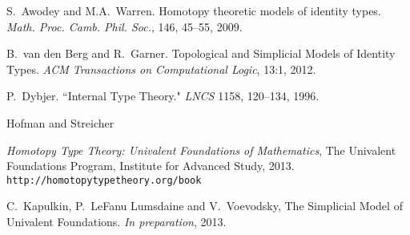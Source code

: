 \documentclass[11pt]{article}
\theoremstyle{remark}
\theoremstyle{definition}
\begin{document}

\begin{thebibliography}{300}

S.~Awodey and M.A.~Warren. Homotopy theoretic models of identity types. \emph{Math. Proc. Camb. Phil. Soc.}, 146, 45--55, 2009.

B.~van den Berg and R.~Garner. Topological and Simplicial Models of Identity Types. \emph{ACM Transactions on Computational Logic}, 13:1, 2012.

P.~Dybjer. ``Internal Type Theory." \emph{LNCS} 1158, 120--134, 1996.

 Hofman and Streicher 

\emph{Homotopy Type Theory: Univalent Foundations of Mathematics}, The Univalent Foundations Program, Institute for Advanced Study, 2013. {\tt http://homotopytypetheory.org/book}

C.~Kapulkin, P.~LeFanu Lumsdaine and V.~Voevodsky, The Simplicial Model of Univalent Foundations. \emph{In preparation}, 2013.

%
\end{thebibliography}

\end{document}
